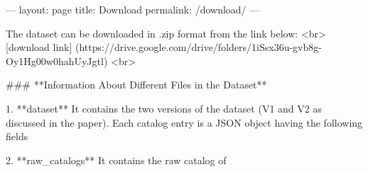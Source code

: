 ---
layout: page
title: Download
permalink: /download/
---

The dataset can be downloaded in .zip format from the link below: <br>
[download link] (https://drive.google.com/drive/folders/1iSsx36u-gvb8g-Oy1Hg00w0hahUyJgtl) <br>

### **Information About Different Files in the Dataset**

1. **dataset**
It contains the two versions of the dataset (V1 and V2 as discussed in the paper). Each catalog entry is a JSON object having the following fields 

2. **raw_catalogs**
It contains the raw catalog of  